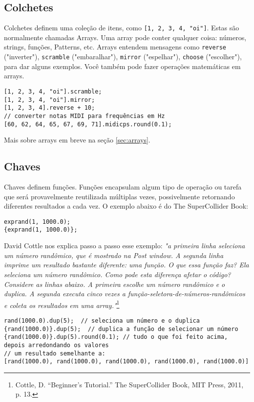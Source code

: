 \subsection{Colchetes}

Colchetes definem uma coleção de itens, como \texttt{[1, 2, 3, 4, "oi"]}. Estas são normalmente chamadas Arrays. Uma array pode conter qualquer coisa: números, strings, funções, Patterns, etc. Arrays entendem mensagens como \texttt{reverse} ("inverter"), \texttt{scramble} ("embaralhar"), \texttt{mirror} ("espelhar"), \texttt{choose} ("escolher"), para dar alguns exemplos. Você também pode fazer operações matemáticas em arrays.


\begin{lstlisting}[style=SuperCollider-IDE, basicstyle=\scttfamily\footnotesize]
[1, 2, 3, 4, "oi"].scramble;
[1, 2, 3, 4, "oi"].mirror;
[1, 2, 3, 4].reverse + 10;
// converter notas MIDI para frequências em Hz 
[60, 62, 64, 65, 67, 69, 71].midicps.round(0.1);
\end{lstlisting}

Mais sobre arrays em breve na seção \ref{sec:arrays}.

\subsection{Chaves}

Chaves definem funções. Funções encapsulam algum tipo de operação ou tarefa que será provavelmente reutilizada múltiplas vezes, possivelmente retornando diferentes resultados a cada vez. O exemplo abaixo é do The SuperCollider Book:

\begin{lstlisting}[style=SuperCollider-IDE, basicstyle=\scttfamily\footnotesize]
exprand(1, 1000.0);
{exprand(1, 1000.0)};
\end{lstlisting}

David Cottle nos explica passo a passo esse exemplo: \textit{"a primeira linha seleciona um número randômico, que é mostrado na Post window. A segunda linha imprime um resultado bastante diferente: uma função. O que essa função faz? Ela seleciona um número randômico. Como pode esta diferença afetar o código? Considere as linhas abaixo. A primeira escolhe um número randômico e o duplica. A segunda executa  cinco vezes a função-seletora-de-números-randômicos e coleta os resultados em uma array."}\footnote{Cottle, D. ``Beginner's Tutorial.'' The SuperCollider Book, MIT Press, 2011, p. 13.}

\begin{lstlisting}[style=SuperCollider-IDE, basicstyle=\scttfamily\footnotesize]
rand(1000.0).dup(5);  // seleciona um número e o duplica
{rand(1000.0)}.dup(5);  // duplica a função de selecionar um número 
{rand(1000.0)}.dup(5).round(0.1); // tudo o que foi feito acima, depois arredondando os valores
// um resultado semelhante a:
[rand(1000.0), rand(1000.0), rand(1000.0), rand(1000.0), rand(1000.0)]
\end{lstlisting}
 

